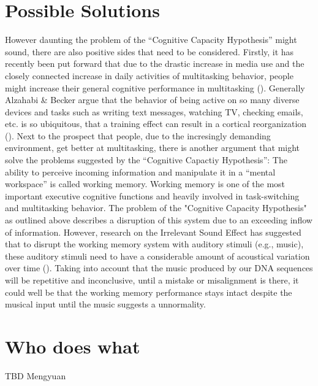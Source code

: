 \documentclass[10pt]{article}
\begin{document}
\section{Possible Solutions}
However daunting the problem of the “Cognitive Capacity Hypothesis” might sound, there are also positive sides that need to be considered. Firstly, it has recently been put forward that due to the drastic increase in media use and the closely connected increase in daily activities of multitasking behavior, people might increase their general cognitive performance in multitasking (\cite{Alzahabi_Becker_2013}). Generally Alzahabi \& Becker argue that the behavior of being active on so many diverse devices and tasks such as writing text messages, watching TV, checking emails, etc. is so ubiquitous, that a training effect can result in a cortical reorganization (\cite{Draganski_May_2008}). Next to the prospect that people, due to the incresingly demanding environment, get better at multitasking, there is another argument that might solve the problems suggested by the “Cognitive Capactiy Hypothesis”: The ability to perceive incoming information and manipulate it in a “mental workspace” is called working memory. Working memory is one of the most important executive cognitive functions and heavily involved in task-switching and multitasking behavior. The problem of the "Cognitive Capacity Hypothesis" as outlined above describes a disruption of this system due to an exceeding inflow of information. However, research on the Irrelevant Sound Effect has suggested that to disrupt the working memory system with auditory stimuli (e.g., music), these auditory stimuli need to have a considerable amount of acoustical variation over time (\cite{Vizard_Perham_2010}). Taking into account that the music produced by our DNA sequences will be repetitive and inconclusive, until a mistake or misalignment is there, it could well be that the working memory performance stays intact despite the musical input until the music suggests a unnormality.

\section{Who does what}

TBD Mengyuan


\newpage
\nocite{*}
\printbibliography
\end{document}
